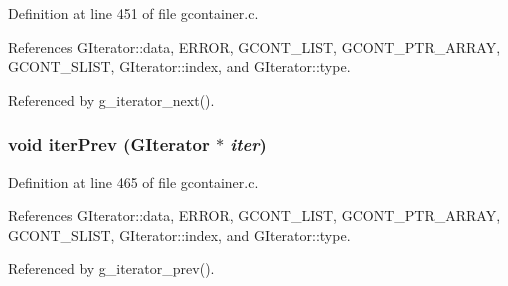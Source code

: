 Definition at line 451 of file gcontainer.c.

References GIterator::data, ERROR, GCONT\_\-LIST, GCONT\_\-PTR\_\-ARRAY, GCONT\_\-SLIST, GIterator::index, and GIterator::type.

Referenced by g\_\-iterator\_\-next().
\subsubsection{\setlength{\rightskip}{0pt plus 5cm}void iter\-Prev ({\bf GIterator} $\ast$ {\em iter})\hspace{0.3cm}{\tt  [static]}}\label{gcontainer_8c_a1}




Definition at line 465 of file gcontainer.c.

References GIterator::data, ERROR, GCONT\_\-LIST, GCONT\_\-PTR\_\-ARRAY, GCONT\_\-SLIST, GIterator::index, and GIterator::type.

Referenced by g\_\-iterator\_\-prev().